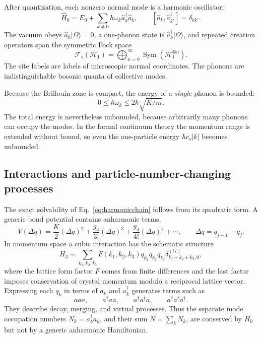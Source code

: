 \documentclass[11pt]{article}
\newcommand{\cH}{\mathcal{H}}
\newcommand{\comm}[2]{\left[#1,#2\right]}
\begin{document}
After quantization, each nonzero normal mode is a harmonic oscillator:
\begin{equation}
  \hat H_0
  =E_0+\sum_{k\ne0}\hbar\omega_k\hat a_k^\dagger\hat a_k,
  \qquad
  \comm{\hat a_k}{\hat a_{k'}^\dagger}=\delta_{kk'}.
  \label{eq:phononH}
\end{equation}
The vacuum obeys $\hat a_k\lvert\Omega\rangle=0$, a one-phonon state is
$\hat a_k^\dagger\lvert\Omega\rangle$, and repeated creation operators span
the symmetric Fock space
\begin{equation}
  \mathcal F_s(\cH_1)
  =\bigoplus_{n=0}^{\infty}\operatorname{Sym}(\cH_1^{\otimes n}).
  \label{eq:phononfock}
\end{equation}
The site labels are labels of microscopic normal coordinates.  The phonons are
indistinguishable bosonic quanta of collective modes.

\begin{remarkbox}
Because the Brillouin zone is compact, the energy of a \emph{single} phonon is
bounded:
\begin{equation*}
  0\leq \hbar\omega_k\leq2\hbar\sqrt{K/m}.
\end{equation*}
The total energy is nevertheless unbounded, because arbitrarily many phonons
can occupy the modes.  In the formal continuum theory the momentum range is
extended without bound, so even the one-particle energy $\hbar c_s|k|$ becomes
unbounded.
\end{remarkbox}

\subsection{Interactions and particle-number-changing processes}

The exact solvability of Eq.~\eqref{eq:harmonicchain} follows from its
quadratic form.  A generic bond potential contains anharmonic terms,
\begin{equation}
  V(\Delta q)
  =\frac K2(\Delta q)^2
  +\frac{g_3}{3!}(\Delta q)^3
  +\frac{g_4}{4!}(\Delta q)^4+\cdots,
  \qquad \Delta q=q_{j+1}-q_j.
  \label{eq:anharmonicreview}
\end{equation}
In momentum space a cubic interaction has the schematic structure
\begin{equation}
  H_3\sim
  \sum_{k_1,k_2,k_3}
  F(k_1,k_2,k_3)
  q_{k_1}q_{k_2}q_{k_3}
  \delta^{(G)}_{k_1+k_2+k_3,0},
  \label{eq:cubicmomentum}
\end{equation}
where the lattice form factor $F$ comes from finite differences and the last
factor imposes conservation of crystal momentum modulo a reciprocal lattice
vector.  Expressing each $q_k$ in terms of $a_k$ and $a_k^\dagger$ generates
terms such as
\begin{equation}
  aaa,
  \qquad a^\dagger aa,
  \qquad a^\dagger a^\dagger a,
  \qquad a^\dagger a^\dagger a^\dagger.
  \label{eq:numberchanging}
\end{equation}
They describe decay, merging, and virtual processes.  Thus the separate mode
occupation numbers $N_k=a_k^\dagger a_k$, and their sum
$N=\sum_kN_k$, are conserved by $H_0$ but not by a generic anharmonic
Hamiltonian.
\end{document}

